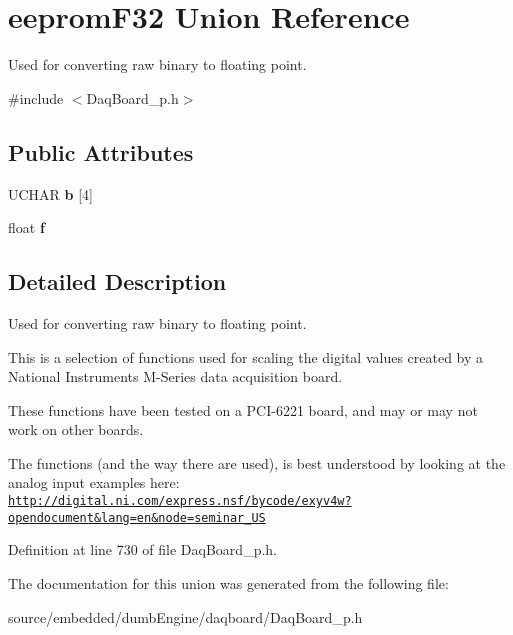 \hypertarget{unioneeprom_f32}{\section{eeprom\-F32 Union Reference}
\label{unioneeprom_f32}
}


Used for converting raw binary to floating point.  




{\ttfamily \#include $<$Daq\-Board\-\_\-p.\-h$>$}

\subsection*{Public Attributes}
\begin{DoxyCompactItemize}
\item 
\hypertarget{unioneeprom_f32_a25ac5929ce7073f56418a05d90874474}{U\-C\-H\-A\-R {\bfseries b} \mbox{[}4\mbox{]}}\label{unioneeprom_f32_a25ac5929ce7073f56418a05d90874474}

\item 
\hypertarget{unioneeprom_f32_abda523724ade8a28595b11f2c3642698}{float {\bfseries f}}\label{unioneeprom_f32_abda523724ade8a28595b11f2c3642698}

\end{DoxyCompactItemize}


\subsection{Detailed Description}
Used for converting raw binary to floating point. 

This is a selection of functions used for scaling the digital values created by a National Instruments M-\/\-Series data acquisition board.

These functions have been tested on a P\-C\-I-\/6221 board, and may or may not work on other boards.

The functions (and the way there are used), is best understood by looking at the analog input examples here\-: \href{http://digital.ni.com/express.nsf/bycode/exyv4w?opendocument&lang=en&node=seminar_US}{\tt http\-://digital.\-ni.\-com/express.\-nsf/bycode/exyv4w?opendocument\&lang=en\&node=seminar\-\_\-\-U\-S} 

Definition at line 730 of file Daq\-Board\-\_\-p.\-h.



The documentation for this union was generated from the following file\-:\begin{DoxyCompactItemize}
\item 
source/embedded/dumb\-Engine/daqboard/Daq\-Board\-\_\-p.\-h\end{DoxyCompactItemize}
